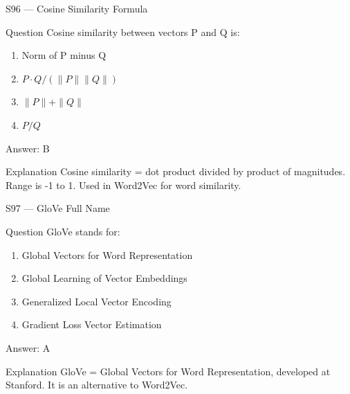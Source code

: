 \documentclass[aspectratio=169,8pt]{beamer}
\begin{document}
	\begin{frame}{S96 --- Cosine Similarity Formula}
		\begin{block}{Question}
			Cosine similarity between vectors P and Q is:
			\begin{enumerate}
				\item Norm of P minus Q
				\item $P \cdot Q / (\|P\| \|Q\|)$
				\item $\|P\| + \|Q\|$
				\item $P/Q$
			\end{enumerate}
		\end{block}
		\begin{exampleblock}{Answer: B}\end{exampleblock}
		\begin{block}{Explanation}
			Cosine similarity = dot product divided by product of magnitudes. Range is -1 to 1. Used in Word2Vec for word similarity.
		\end{block}
	\end{frame}
	
	\begin{frame}{S97 --- GloVe Full Name}
		\begin{block}{Question}
			GloVe stands for:
			\begin{enumerate}
				\item Global Vectors for Word Representation
				\item Global Learning of Vector Embeddings
				\item Generalized Local Vector Encoding
				\item Gradient Loss Vector Estimation
			\end{enumerate}
		\end{block}
		\begin{exampleblock}{Answer: A}\end{exampleblock}
		\begin{block}{Explanation}
			GloVe = Global Vectors for Word Representation, developed at Stanford. It is an alternative to Word2Vec.
		\end{block}
	\end{frame}
	
\end{document}
